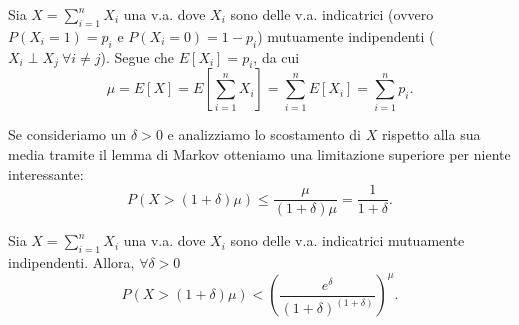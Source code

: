 Sia $X=\sum_{i=1}^{n}X_i$ una v.a. dove $X_i$ sono delle v.a. indicatrici (ovvero $P(X_i=1)=p_i$ e $P(X_i=0)=1-p_i$) mutuamente indipendenti ($X_i\perp X_j\ \forall i\neq j$). Segue che $E[X_i]=p_i$, da cui
\[
\mu = E[X] = E\left[\sum_{i=1}^{n}X_i\right] = \sum_{i=1}^{n}E[X_i]=\sum_{i=1}^{n}p_i.
\]

Se consideriamo un $\delta > 0$ e analizziamo lo scostamento di $X$ rispetto alla sua media tramite il lemma di Markov otteniamo una limitazione superiore per niente interessante:
\[
P(X > (1+\delta)\mu) \leq \frac{\mu}{(1+\delta)\mu} = \frac{1}{1+\delta}.
\]

\begin{teorema}
Sia $X=\sum_{i=1}^{n}X_i$ una v.a. dove $X_i$ sono delle v.a. indicatrici mutuamente indipendenti. Allora, $\forall \delta > 0$
\[
P(X>(1+\delta)\mu) < \left(\frac{e^\delta}{(1+\delta)^{(1+\delta)}}\right)^\mu.
\]
\end{teorema}

